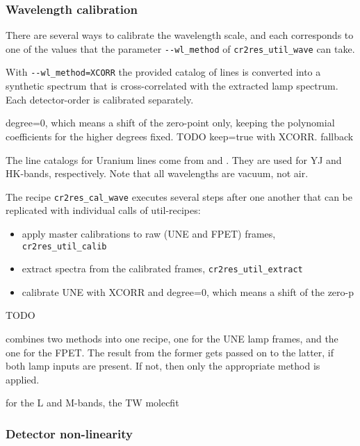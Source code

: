 \subsubsection{Wavelength calibration}


There are several ways to calibrate the wavelength scale, and each corresponds
to one of the values that the parameter \texttt{-{}-wl\_method} of
\texttt{cr2res\_util\_wave} can take.

With \texttt{-{}-wl\_method=XCORR} the provided catalog of lines is converted
into a synthetic spectrum that is cross-correlated with the extracted lamp
spectrum. Each detector-order is calibrated separately.

degree=0, which means a shift of the zero-point only, keeping the polynomial coefficients for the higher degrees fixed.
TODO
keep=true with XCORR.
fallback

The line catalogs for Uranium lines come from \cite{2018A&A...618A.118S} and
\cite{2011ApJS..195...24R}. They are used for YJ and HK-bands, respectively.
Note that all wavelengths are vacuum, not air.



The recipe \texttt{cr2res\_cal\_wave} executes several steps after one another that can be replicated with individual calls of util-recipes:

\begin{itemize}
    \item apply master calibrations to raw (UNE and FPET) frames, \verb!cr2res_util_calib!
    \item extract spectra from the calibrated frames, \verb!cr2res_util_extract!
    \item calibrate UNE with XCORR and degree=0, which means a shift of the zero-p
    
\end{itemize}

TODO

combines two methods into one recipe, one
for the UNE lamp frames, and the one for the FPET. The result from the former
gets passed on to the latter, if both lamp inputs are present. If not, then only
the appropriate method is applied. 



for the L and M-bands, the TW
molecfit

\subsubsection{Detector non-linearity}
\label{sec:detlin}

